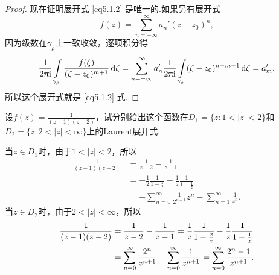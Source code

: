 \begin{proof}
  现在证明展开式 \eqref{eq5.1.2} 是唯一的.如果另有展开式
  \[
    f(z) = \sum_{n=-\infty}^{\infty}a_n'(z-z_0)^n,
  \]
  因为级数在$\gamma_\rho$上一致收敛，逐项积分得
  \[
    \frac1{2\uppi\mathrm i}\int\limits_{\gamma_\rho}
    \frac{f(\zeta)}{(\zeta-z_0)^{m+1}}\mathop{}\!\mathrm{d} \zeta
    = \sum_{n=-\infty}^\infty a_n'\frac1{2\uppi\mathrm i}
    \int\limits_{\gamma_\rho}(\zeta-z_0)^{n-m-1}\mathop{}\!\mathrm{d} \zeta=a_{m}'.
  \]
  所以这个展开式就是 \eqref{eq5.1.2} 式.
\end{proof}

\begin{example}\label{exam5.1.3}
  设$f(z)=\frac1{(z-1)(z-2)}$，试分别给出这个函数在$D_1=\{z:1<|z|<2\}$和$D_2=\{z:2<|z|<\infty\}$上的Laurent展开式.
\end{example}
\begin{solution}
  当$z\in D_1$时，由于$1<|z|<2$，所以
  \begin{align*}
    \frac1{(z-1)(z-2)} & = \frac1{z-2}-\frac1{z-1}\\
    & = -\frac12\frac1{1-\frac z2}-\frac1z\frac1{1-\frac1z}\\
    & = -\sum_{n=0}^\infty\frac1{2^{n+1}}z^n-\sum_{n=1}^\infty\frac1{z^n}.
  \end{align*}
  当$z\in D_2$时，由于$2<|z|<\infty$，所以
  \begin{align*}
    \frac1{(z-1)(z-2)} & = \frac1{z-2}-\frac1{z-1}
    = \frac1z \frac1{1-\frac2z} - \frac1z \frac1{1-\frac1z}\\
    & = \sum_{n=0}^\infty\frac{2^n}{z^{n+1}} - \sum_{n=0}^\infty\frac1{z^{n+1}}
    =\sum_{n=0}^\infty\frac{2^n-1}{z^{n+1}}. \qedhere
  \end{align*}
\end{solution}

